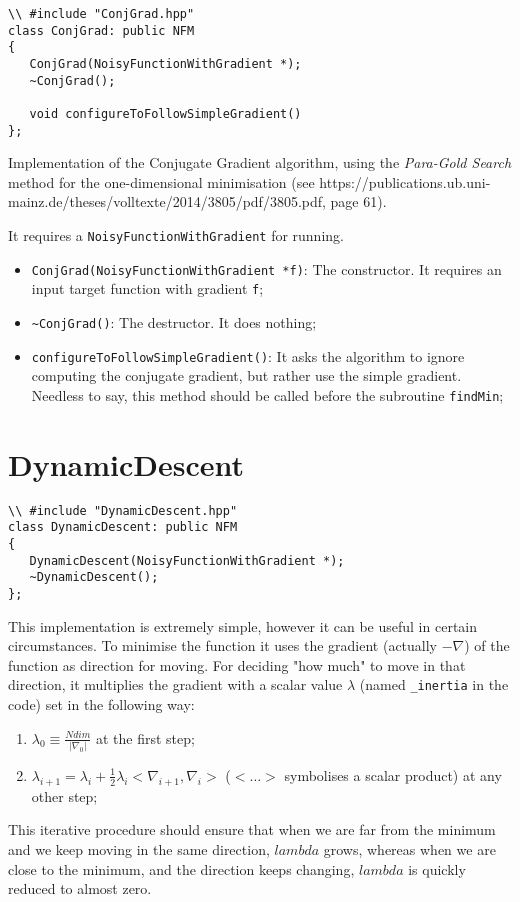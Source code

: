 \documentclass[11pt,a4paper,twoside]{article}
\begin{document}
\begin{lstlisting}
\\ #include "ConjGrad.hpp"
class ConjGrad: public NFM
{
   ConjGrad(NoisyFunctionWithGradient *);
   ~ConjGrad();

   void configureToFollowSimpleGradient()
};
\end{lstlisting}

Implementation of the Conjugate Gradient algorithm, using the \emph{Para-Gold Search} method for the one-dimensional minimisation (see https://publications.ub.uni-mainz.de/theses/volltexte/2014/3805/pdf/3805.pdf, page 61).

It requires a \verb+NoisyFunctionWithGradient+ for running.

\begin{itemize}
\item \verb+ConjGrad(NoisyFunctionWithGradient *f)+: The constructor. It requires an input target function with gradient \verb+f+;
\item \verb+~ConjGrad()+: The destructor. It does nothing;
\item \verb+configureToFollowSimpleGradient()+: It asks the algorithm to ignore computing the conjugate gradient, but rather use the simple gradient. Needless to say, this method should be called before the subroutine \verb+findMin+;
\end{itemize}





\section{DynamicDescent} %
\label{sec:dynamicdescent}

\begin{lstlisting}
\\ #include "DynamicDescent.hpp"
class DynamicDescent: public NFM
{
   DynamicDescent(NoisyFunctionWithGradient *);
   ~DynamicDescent();
};
\end{lstlisting}

This implementation is extremely simple, however it can be useful in certain circumstances. To minimise the function it uses the gradient (actually $-\nabla$) of the function as direction for moving. For deciding "how much" to move in that direction, it multiplies the gradient with a scalar value $\lambda$ (named \verb+_inertia+ in the code) set in the following way:
\begin{enumerate}
\item $\lambda_0 \equiv \frac{Ndim}{\left| \nabla_0 \right|}$ at the first step;
\item $\lambda_{i+1} = \lambda_i + \frac{1}{2} \lambda_i <\nabla_{i+1}, \nabla_i>$ ($< \dots >$ symbolises a scalar product) at any other step;
\end{enumerate}
This iterative procedure should ensure that when we are far from the minimum and we keep moving in the same direction, $lambda$ grows, whereas when we are close to the minimum, and the direction keeps changing, $lambda$ is quickly reduced to almost zero.
\end{document}
